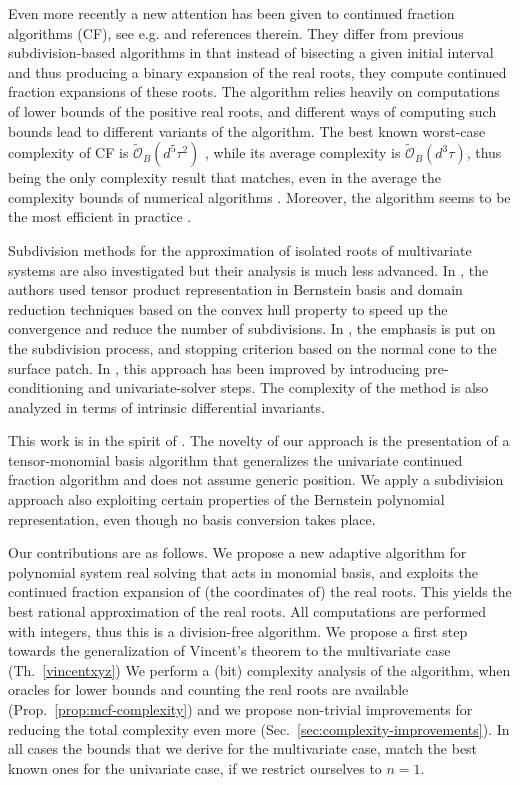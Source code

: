 \documentclass{sig-alternate}
\newcommand{\sOB}{\ensuremath{\widetilde{\mathcal{O}}_B}\xspace}
\begin{document}
Even more recently a new attention has been given to continued
fraction algorithms (CF), see
e.g. \cite{sharma-tcs-2008,et-tcs-2007} and references
therein. They differ from previous subdivision-based algorithms in
that instead of bisecting a given initial interval and thus producing
a binary expansion of the real roots, they compute continued fraction
expansions of these roots. The algorithm relies heavily on
computations of lower bounds of the positive real roots, and different
ways of computing such bounds lead to different variants of the
algorithm.  The best known worst-case complexity of CF is $\sOB( d^5
\tau^2)$ \cite{sharma-tcs-2008}, while its average complexity is
$\sOB( d^3 \tau)$, thus being the only complexity result that matches,
even in the average the complexity bounds of numerical algorithms
\cite{Pan02jsc}.  Moreover, the algorithm seems to be the most
efficient in practice \cite{ACS-TR-363602-02,et-tcs-2007}.


Subdivision methods for the approximation of isolated roots of
multivariate systems are also investigated but their analysis is much
less advanced.  In \cite{sp-csnps-93}, the authors used tensor product
representation in Bernstein basis and domain reduction techniques
based on the convex hull property to speed up the convergence and
reduce the number of subdivisions. In \cite{ELBER:2001}, the emphasis
is put on the subdivision process, and stopping criterion based on the
normal cone to the surface patch.  In \cite{mp:smspe-05}, this
approach has been improved by introducing pre-conditioning and
univariate-solver steps. The complexity of the method is also analyzed
in terms of intrinsic differential invariants.

This work is in the spirit of \cite{mp:smspe-05}.  The novelty of our
approach is the presentation of a tensor-monomial basis algorithm that
generalizes the univariate continued fraction algorithm and does not
assume generic position. We apply a subdivision approach also
exploiting certain properties of the Bernstein polynomial
representation, even though no basis conversion takes place.



Our contributions are as follows.
We propose a new adaptive algorithm for polynomial system real solving
that acts in monomial basis, and exploits the continued fraction
expansion of (the coordinates of) the real roots.  This yields the
best rational approximation of the real roots.  All computations are
performed with integers, thus this is a division-free algorithm.
We propose a first step towards the generalization of Vincent's
theorem to the multivariate case (Th.~\ref{vincentxyz})
We perform a (bit) complexity analysis of the algorithm, when oracles
for lower bounds and counting the real roots are available
(Prop.~\ref{prop:mcf-complexity}) and we propose non-trivial
improvements for reducing the total complexity even more
(Sec.~\ref{sec:complexity-improvements}).  In all cases the bounds
that we derive for the multivariate case, match the best known ones
for the univariate case, if we restrict ourselves to $n=1$.
\end{document}
